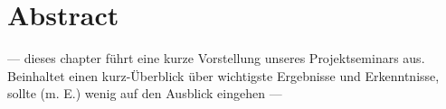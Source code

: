 \documentclass[./Report.tex]{subfiles}
\begin{document}
\chapter{Abstract}
\label{chap:abstract}

--- dieses chapter führt eine kurze Vorstellung unseres Projektseminars aus. Beinhaltet einen kurz-Überblick über wichtigste Ergebnisse und Erkenntnisse, sollte (m. E.) wenig auf den Ausblick eingehen ---
\end{document}
